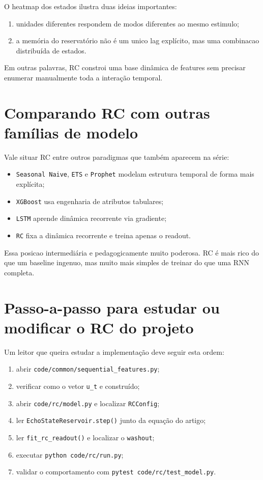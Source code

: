 \documentclass[12pt]{article}
\providecommand{\tightlist}{%
  \setlength{\itemsep}{0pt}\setlength{\parskip}{0pt}}
\begin{document}
O heatmap dos estados ilustra duas ideias importantes:

\begin{enumerate}
\def\labelenumi{\arabic{enumi}.}
\tightlist
\item
  unidades diferentes respondem de modos diferentes ao mesmo estimulo;
\item
  a memória do reservatório não é um unico lag explícito, mas uma combinacao distribuída de estados.
\end{enumerate}

Em outras palavras, RC constroi uma base dinâmica de features sem precisar enumerar manualmente toda a interação temporal.

\section{Comparando RC com outras famílias de modelo}\label{9-comparando-rc-com-outras-famuxedlias-de-modelo}

Vale situar RC entre outros paradigmas que também aparecem na série:

\begin{itemize}
\tightlist
\item
  \texttt{Seasonal\ Naive}, \texttt{ETS} e \texttt{Prophet} modelam estrutura temporal de forma mais explícita;
\item
  \texttt{XGBoost} usa engenharia de atributos tabulares;
\item
  \texttt{LSTM} aprende dinâmica recorrente via gradiente;
\item
  \texttt{RC} fixa a dinâmica recorrente e treina apenas o readout.
\end{itemize}

Essa posicao intermediária e pedagogicamente muito poderosa. RC é mais rico do que um baseline ingenuo, mas muito mais simples de treinar do que uma RNN completa.

\section{Passo-a-passo para estudar ou modificar o RC do projeto}\label{10-passo-a-passo-para-estudar-ou-modificar-o-rc-do-projeto}

Um leitor que queira estudar a implementação deve seguir esta ordem:

\begin{enumerate}
\def\labelenumi{\arabic{enumi}.}
\tightlist
\item
  abrir \texttt{code/common/sequential\_features.py};
\item
  verificar como o vetor \texttt{u\_t} e construído;
\item
  abrir \texttt{code/rc/model.py} e localizar \texttt{RCConfig};
\item
  ler \texttt{EchoStateReservoir.step()} junto da equação do artigo;
\item
  ler \texttt{fit\_rc\_readout()} e localizar o \texttt{washout};
\item
  executar \texttt{python\ code/rc/run.py};
\item
  validar o comportamento com \texttt{pytest\ code/rc/test\_model.py}.
\end{enumerate}
\end{document}
